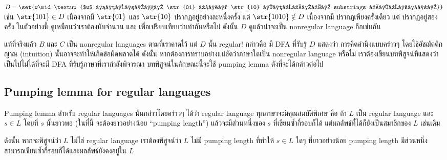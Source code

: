 \begin{example}
$D=\set{w\mid\textup{$w$ มีจำนวน \str{01} และ \str{10} ที่เป็น substrings เท่ากัน}}$ \enskip เช่น $\str{101}\in D$ เนื่องจากมี $\str{01}$ และ $\str{10}$ ปรากฏอยู่อย่างละหนึ่งครั้ง แต่ $\str{1010}\notin D$ เนื่องจากมี  ปรากฏเพียงครั้งเดียว แต่  ปรากฏอยู่สองครั้ง \enskip ในตัวอย่างนี้ ดูเหมือนว่าเราต้องนับจำนวน  และ  เพื่อเปรียบเทียบว่าเท่ากันหรือไม่ \enskip ดังนั้น $D$ ดูแล้วน่าจะเป็น nonregular language อีกเช่นกัน
\end{example}

แท้ที่จริงแล้ว $B$ และ $C$ เป็น nonregular languages ตามที่เราคาดไว้ แต่ $D$ นั้น regular! กล่าวคือ มี DFA ที่รับรู้ $D$ \enskip แสดงว่า การคิดคำนึงแบบคร่าวๆ โดยใช้อัชฌัตติกญาณ (intuition) นั้นอาจจะทำให้เกิดข้อผิดพลาดได้ \enskip ดังนั้น หากต้องการทราบอย่างแน่ชัดว่าภาษาใดเป็น nonregular language หรือไม่ เราต้องเขียนบทพิสูจน์ที่แสดงว่าเป็นไปไม่ได้ที่จะมี DFA ที่รับรู้ภาษาที่เรากำลังพิจารณา \enskip บทพิสูจน์ในลักษณะนี้จะใช้ pumping lemma ดังที่จะได้กล่าวต่อไป

\subsection{Pumping lemma for regular languages}

Pumping lemma สำหรับ regular languages นั้นกล่าวโดยคร่าวๆ ได้ว่า regular language ทุกภาษาจะมีคุณสมบัติพิเศษ คือ ถ้า $L$ เป็น regular language และ $s\in L$ โดยที่ $s$ นั้นยาวพอ (ในที่นี้ จะต้องยาวอย่างน้อย ``pumping length'') แล้วจะมีส่วนหนึ่งของ $s$ ที่เขียนซ้ำกี่รอบก็ได้ แต่ผลลัพธ์ที่ได้ก็ยังเป็นสมาชิกของ $L$ เช่นเดิม

ดังนั้น หากจะพิสูจน์ว่า $L$ ไม่ใช่ regular language เราต้องพิสูจน์ว่า $L$ ไม่มี pumping length ที่ทำให้ $s\in L$ ใดๆ ที่ยาวอย่างน้อย pumping length มีส่วนหนึ่งสามารถเขียนซ้ำกี่รอบก็ได้และผลลัพธ์ยังคงอยู่ใน $L$

